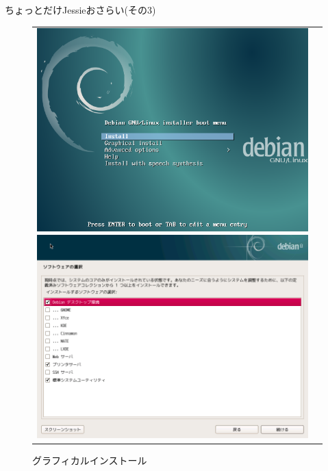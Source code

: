 \begin{frame}{ちょっとだけJessieおさらい(その3)}

\begin{figure}[htbp]
\begin{tabular}{cc}
\begin{minipage}{0.5\hsize}
\includegraphics[width=0.8\hsize]{image201509/debian8-inst-01.png}
\caption{インストーラ起動直後}
\end{minipage}
\begin{minipage}{0.5\hsize}
\includegraphics[width=0.8\hsize]{image201509/debian8-inst-02.png}
\caption{グラフィカルインストール}
\end{minipage}
\end{tabular}
\end{figure}

\end{frame}

